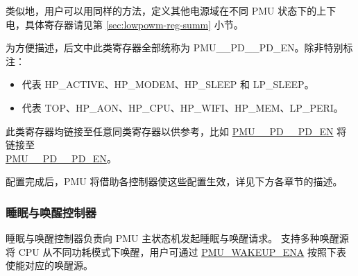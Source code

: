 \documentclass[main\_\_CN.tex]{subfiles}
\begin{document}
类似地，用户可以用同样的方法，定义其他电源域在不同 PMU 状态下的上下电，具体寄存器请见第 \ref{sec:lowpowm-reg-summ} 小节。

\begin{tiplisting}
为方便描述，后文中此类寄存器全部统称为 PMU\_\_PD\_\_PD\_EN。除非特别标注：
\begin{itemize}
\item {} 代表 HP\_ACTIVE、HP\_MODEM、HP\_SLEEP 和 LP\_SLEEP。
\item {} 代表 TOP、HP\_AON、HP\_CPU、HP\_WIFI、HP\_MEM、LP\_PERI。
\end{itemize}
此类寄存器均链接至任意同类寄存器以供参考，比如 \hyperref[fielddesc:PMUHPACTIVEPDTOPPDEN]{PMU\_\_PD\_\_PD\_EN} 将链接至 \\\hyperref[fielddesc:PMUHPACTIVEPDTOPPDEN]{PMU\_\_PD\_\_PD\_EN}。
\end{tiplisting}

配置完成后，PMU 将借助各控制器使这些配置生效，详见下方各章节的描述。

\subsubsection{睡眠与唤醒控制器}

睡眠与唤醒控制器负责向 PMU 主状态机发起睡眠与唤醒请求。\chipname{} 支持多种唤醒源将 CPU 从不同功耗模式下唤醒，用户可通过 \hyperref[fielddesc:PMUWAKEUPENA]{PMU\_WAKEUP\_ENA} 按照下表使能对应的唤醒源。
\end{document}
